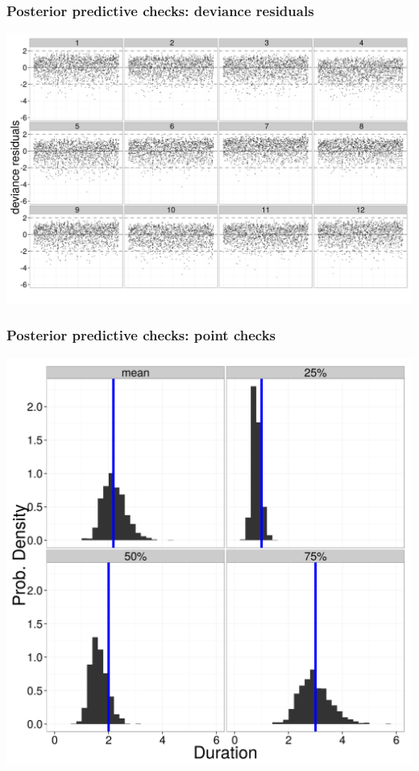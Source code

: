 \documentclass{beamer}
\begin{document}
\begin{frame}
  \frametitle{Posterior predictive checks: deviance residuals}
  \begin{center}
    \includegraphics[height = 0.8\textheight, width = \textwidth,  keepaspectratio = true]{figure/residual_plot}
  \end{center}
\end{frame}

\begin{frame}
  \frametitle{Posterior predictive checks: point checks}
  \begin{center}
    \includegraphics[height = 0.8\textheight, width = \textwidth,  keepaspectratio = true]{figure/quant_ppc}
  \end{center}
\end{frame}
\end{document}
